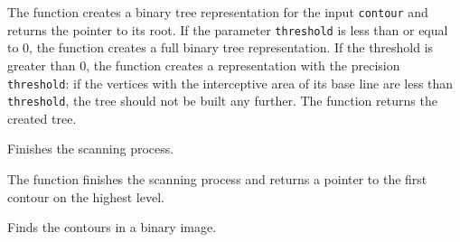 The function creates a binary tree representation for the input \texttt{contour} and returns the pointer to its root. If the parameter \texttt{threshold} is less than or equal to 0, the function creates a full binary tree representation. If the threshold is greater than 0, the function creates a representation with the precision \texttt{threshold}: if the vertices with the interceptive area of its base line are less than \texttt{threshold}, the tree should not be built any further. The function returns the created tree.

\ifC %

Finishes the scanning process.


\begin{description}
\end{description}

The function finishes the scanning process and returns a pointer to the first contour on the highest level.

\fi %

Finds the contours in a binary image.


